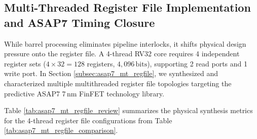 \subsection{Multi-Threaded Register File Implementation and ASAP7 Timing Closure}

While barrel processing eliminates pipeline interlocks, it shifts physical design pressure onto the register file. A 4-thread RV32 core requires 4 independent register sets ($4 \times 32 = 128$ registers, $4,096\,\text{bits}$), supporting 2 read ports and 1 write port. In Section \ref{subsec:asap7_mt_regfile}, we synthesized and characterized multiple multithreaded register file topologies targeting the predictive ASAP7 7\,nm FinFET technology library.

Table \ref{tab:asap7_mt_regfile_review} summarizes the physical synthesis metrics for the 4-thread register file configurations from Table \ref{tab:asap7_mt_regfile_comparison}.

\begin{table}[htbp]
\centering
\footnotesize
\renewcommand{\arraystretch}{1.25}
\caption{Physical implementation metrics of 4-thread multithreaded register files in ASAP7 7\,nm FinFET technology.}
\label{tab:asap7_mt_regfile_review}
\end{table}

